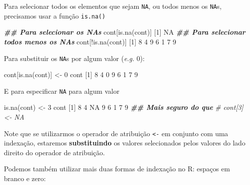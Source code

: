 \documentclass[
  10pt,
  a4paper]{book}
\newenvironment{Shaded}{\begin{snugshade}}{\end{snugshade}}
\newcommand{\CommentTok}[1]{\textcolor[rgb]{0.56,0.35,0.01}{\textit{#1}}}
\newcommand{\ConstantTok}[1]{\textcolor[rgb]{0.00,0.00,0.00}{#1}}
\newcommand{\DecValTok}[1]{\textcolor[rgb]{0.00,0.00,0.81}{#1}}
\newcommand{\DocumentationTok}[1]{\textcolor[rgb]{0.56,0.35,0.01}{\textbf{\textit{#1}}}}
\newcommand{\FunctionTok}[1]{\textcolor[rgb]{0.00,0.00,0.00}{#1}}
\newcommand{\NormalTok}[1]{#1}
\newcommand{\OtherTok}[1]{\textcolor[rgb]{0.56,0.35,0.01}{#1}}
\newcommand{\SpecialCharTok}[1]{\textcolor[rgb]{0.00,0.00,0.00}{#1}}
\begin{document}
Para selecionar todos os elementos que sejam \texttt{NA}, ou todos menos os
\texttt{NA}s, precisamos usar a função \texttt{is.na()}

\begin{Shaded}
\begin{Highlighting}[]
\DocumentationTok{\#\# Para selecionar os NAs}
\NormalTok{cont[}\FunctionTok{is.na}\NormalTok{(cont)]}
\NormalTok{[}\DecValTok{1}\NormalTok{] }\ConstantTok{NA}
\DocumentationTok{\#\# Para selecionar todos menos os NAs}
\NormalTok{cont[}\SpecialCharTok{!}\FunctionTok{is.na}\NormalTok{(cont)]}
\NormalTok{[}\DecValTok{1}\NormalTok{] }\DecValTok{8} \DecValTok{4} \DecValTok{9} \DecValTok{6} \DecValTok{1} \DecValTok{7} \DecValTok{9}
\end{Highlighting}
\end{Shaded}

Para substituir os \texttt{NA}s por algum valor (\emph{e.g.} 0):

\begin{Shaded}
\begin{Highlighting}[]
\NormalTok{cont[}\FunctionTok{is.na}\NormalTok{(cont)] }\OtherTok{\textless{}{-}} \DecValTok{0}
\NormalTok{cont}
\NormalTok{[}\DecValTok{1}\NormalTok{] }\DecValTok{8} \DecValTok{4} \DecValTok{0} \DecValTok{9} \DecValTok{6} \DecValTok{1} \DecValTok{7} \DecValTok{9}
\end{Highlighting}
\end{Shaded}

E para especificar \texttt{NA} para algum valor

\begin{Shaded}
\begin{Highlighting}[]
\FunctionTok{is.na}\NormalTok{(cont) }\OtherTok{\textless{}{-}} \DecValTok{3}
\NormalTok{cont}
\NormalTok{[}\DecValTok{1}\NormalTok{]  }\DecValTok{8}  \DecValTok{4} \ConstantTok{NA}  \DecValTok{9}  \DecValTok{6}  \DecValTok{1}  \DecValTok{7}  \DecValTok{9}
\DocumentationTok{\#\# Mais seguro do que}
\CommentTok{\# cont[3] \textless{}{-} NA}
\end{Highlighting}
\end{Shaded}

Note que se utilizarmos o operador de atribuição \texttt{\textless{}-} em conjunto com
uma indexação, estaremos \textbf{substituindo} os valores selecionados
pelos valores do lado direito do operador de atribuição.

Podemos também utilizar mais duas formas de indexação no R: espaços em
branco e zero:
\end{document}
